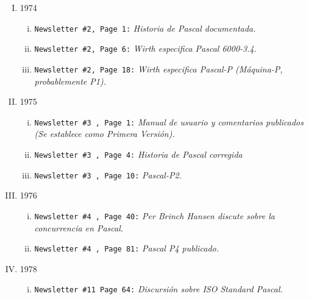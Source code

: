 \begin{enumerate}[I.]

\item 1974

\begin{enumerate}[i.]

\item \texttt{Newsletter \#2, Page 1:} \textit{Historia de Pascal documentada.}

\item \texttt{Newsletter \#2, Page 6:} \textit{Wirth especifica Pascal 6000-3.4.}

\item \texttt{Newsletter \#2, Page 18:} \textit{Wirth especifica Pascal-P (Máquina-P, probablemente P1).}

\end{enumerate}

\item 1975

\begin{enumerate}[i.]

\item \texttt{Newsletter \#3 , Page 1:} \textit{Manual de usuario y comentarios publicados (Se establece como Primera Versión).}

\item \texttt{Newsletter \#3 , Page 4:} \textit{Historia de Pascal corregida}

\item \texttt{Newsletter \#3 , Page 10:} \textit{Pascal-P2.}

\end{enumerate}

\item 1976

\begin{enumerate}[i.]

\item \texttt{Newsletter \#4 , Page 40:} \textit{Per Brinch Hansen discute sobre la concurrencia en Pascal.}

\item \texttt{Newsletter \#4 , Page 81:} \textit{Pascal P4 publicado.}

\end{enumerate}

\item 1978

\begin{enumerate}[i.]

\item \texttt{Newsletter \#11 Page 64:} \textit{Discursión sobre ISO Standard Pascal.}


\end{enumerate}
\end{enumerate}
